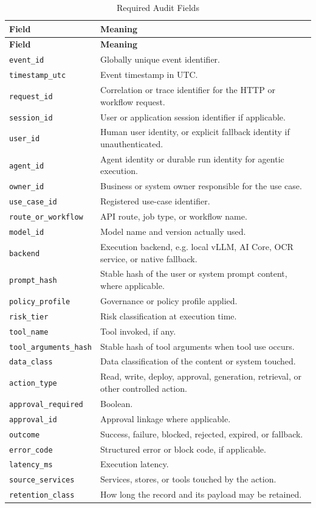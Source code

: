 \documentclass[11pt,a4paper]{article}
\begin{document}
\begin{longtable}{P{0.22\textwidth}P{0.62\textwidth}}
\caption{Required Audit Fields} \\
\toprule
\textbf{Field} & \textbf{Meaning} \\
\midrule
\endfirsthead
\toprule
\textbf{Field} & \textbf{Meaning} \\
\midrule
\endhead
\texttt{event\_id} & Globally unique event identifier. \\
\texttt{timestamp\_utc} & Event timestamp in UTC. \\
\texttt{request\_id} & Correlation or trace identifier for the HTTP or workflow request. \\
\texttt{session\_id} & User or application session identifier if applicable. \\
\texttt{user\_id} & Human user identity, or explicit fallback identity if unauthenticated. \\
\texttt{agent\_id} & Agent identity or durable run identity for agentic execution. \\
\texttt{owner\_id} & Business or system owner responsible for the use case. \\
\texttt{use\_case\_id} & Registered use-case identifier. \\
\texttt{route\_or\_workflow} & API route, job type, or workflow name. \\
\texttt{model\_id} & Model name and version actually used. \\
\texttt{backend} & Execution backend, e.g. local vLLM, AI Core, OCR service, or native fallback. \\
\texttt{prompt\_hash} & Stable hash of the user or system prompt content, where applicable. \\
\texttt{policy\_profile} & Governance or policy profile applied. \\
\texttt{risk\_tier} & Risk classification at execution time. \\
\texttt{tool\_name} & Tool invoked, if any. \\
\texttt{tool\_arguments\_hash} & Stable hash of tool arguments when tool use occurs. \\
\texttt{data\_class} & Data classification of the content or system touched. \\
\texttt{action\_type} & Read, write, deploy, approval, generation, retrieval, or other controlled action. \\
\texttt{approval\_required} & Boolean. \\
\texttt{approval\_id} & Approval linkage where applicable. \\
\texttt{outcome} & Success, failure, blocked, rejected, expired, or fallback. \\
\texttt{error\_code} & Structured error or block code, if applicable. \\
\texttt{latency\_ms} & Execution latency. \\
\texttt{source\_services} & Services, stores, or tools touched by the action. \\
\texttt{retention\_class} & How long the record and its payload may be retained. \\
\bottomrule
\end{longtable}
\end{document}
